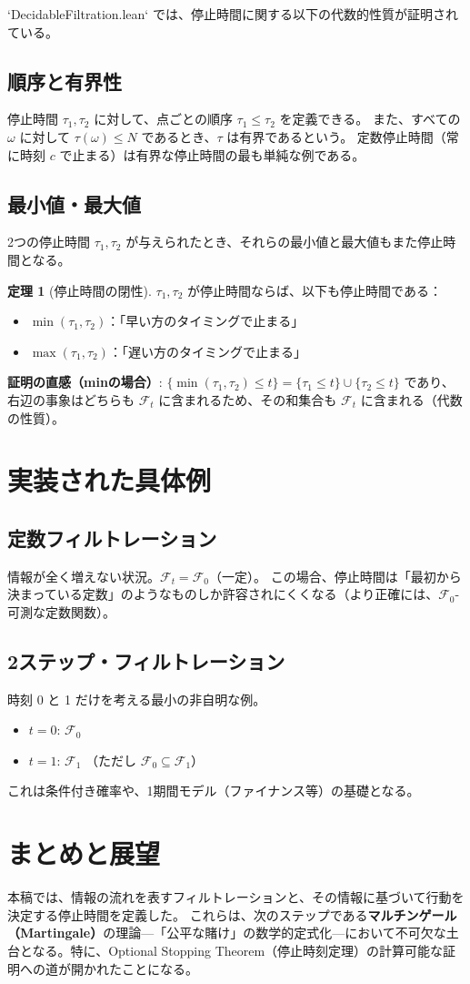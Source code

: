 \documentclass[a4paper,11pt]{article}
\theoremstyle{definition}
\newtheorem{theorem}{定理}[section]
\begin{document}
`DecidableFiltration.lean` では、停止時間に関する以下の代数的性質が証明されている。

\subsection{順序と有界性}
停止時間 $\tau_1, \tau_2$ に対して、点ごとの順序 $\tau_1 \le \tau_2$ を定義できる。
また、すべての $\omega$ に対して $\tau(\omega) \le N$ であるとき、$\tau$ は有界であるという。
定数停止時間（常に時刻 $c$ で止まる）は有界な停止時間の最も単純な例である。

\subsection{最小値・最大値}
2つの停止時間 $\tau_1, \tau_2$ が与えられたとき、それらの最小値と最大値もまた停止時間となる。
\begin{theorem}[停止時間の閉性]
$\tau_1, \tau_2$ が停止時間ならば、以下も停止時間である：
\begin{itemize}
    \item $\min(\tau_1, \tau_2)$：「早い方のタイミングで止まる」
    \item $\max(\tau_1, \tau_2)$：「遅い方のタイミングで止まる」
\end{itemize}
\end{theorem}

\textbf{証明の直感（minの場合）}:
$\{\min(\tau_1, \tau_2) \le t\} = \{\tau_1 \le t\} \cup \{\tau_2 \le t\}$ であり、右辺の事象はどちらも $\mathcal{F}_t$ に含まれるため、その和集合も $\mathcal{F}_t$ に含まれる（代数の性質）。

\section{実装された具体例}

\subsection{定数フィルトレーション}
情報が全く増えない状況。$\mathcal{F}_t = \mathcal{F}_0$（一定）。
この場合、停止時間は「最初から決まっている定数」のようなものしか許容されにくくなる（より正確には、$\mathcal{F}_0$-可測な定数関数）。

\subsection{2ステップ・フィルトレーション}
時刻 0 と 1 だけを考える最小の非自明な例。
\begin{itemize}
    \item $t=0$: $\mathcal{F}_0$
    \item $t=1$: $\mathcal{F}_1$ （ただし $\mathcal{F}_0 \subseteq \mathcal{F}_1$）
\end{itemize}
これは条件付き確率や、1期間モデル（ファイナンス等）の基礎となる。

\section{まとめと展望}
本稿では、情報の流れを表すフィルトレーションと、その情報に基づいて行動を決定する停止時間を定義した。
これらは、次のステップである\textbf{マルチンゲール（Martingale）}の理論---「公平な賭け」の数学的定式化---において不可欠な土台となる。特に、Optional Stopping Theorem（停止時刻定理）の計算可能な証明への道が開かれたことになる。
\end{document}
